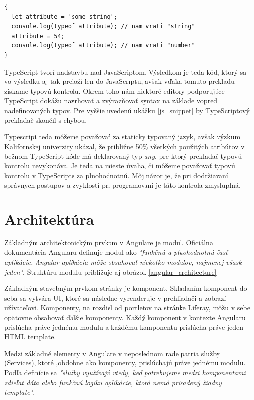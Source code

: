 \documentclass[
  digital, %
  twoside, %
  notable,   %
  nolof,   %
  nolot,   %
]{fithesis3}
\begin{document}
\begin{lstlisting}[caption={Kód v JavaScripte},captionpos=b,label=js_snippet]
{
  let attribute = 'some_string';
  console.log(typeof attribute); // nam vrati "string"
  attribute = 54;
  console.log(typeof attribute); // nam vrati "number"
}
\end{lstlisting}

TypeScript tvorí nadstavbu nad JavaScriptom. Výsledkom je teda kód, ktorý sa vo výsledku aj tak preloží len do JavaScriptu, avšak vďaka tomuto prekladu získame typovú kontrolu. Okrem toho nám niektoré editory podporujúce TypeScript dokážu navrhovať a zvýrazňovať syntax na základe vopred nadefinovaných typov. Pre vyššie uvedenú ukážku \ref{js_snippet} by TypeScriptový prekladač skončil s chybou.

Typescript teda môžeme považovať za staticky typovaný jazyk, avšak výzkum Kalifornskej univerzity\cite{ray2014large} ukázal, že približne 50\% všetkých použitých atribútov v bežnom TypeScript kóde má deklarovaný typ \textit{any}, pre ktorý prekladač typovú kontrolu nevykonáva. Je teda na mieste úvaha, či môžeme považovať typovú kontrolu v TypeScripte za plnohodnotnú. Môj názor je, že pri dodržiavaní správnych postupov a zvyklostí pri programovaní je táto kontrola zmysluplná.

\section{Architektúra}
Základným architektonickým prvkom v Angulare je modul. Oficiálna dokumentácia Angularu definuje modul ako \textit{"funkčnú a plnohodnotnú časť aplikácie. Angular aplikácia môže obsahovať niekoľko modulov, najmenej všask jeden"}\cite{angular}. Štruktúru modulu približuje aj obrázok \ref{angular_architecture}

Základným stavebným prvkom stránky je komponent. Skladaním komponent do seba sa vytvára UI, ktoré sa následne vyrenderuje v prehliadači a zobrazí užívateľovi. Komponenty, na rozdiel od portletov na stránke Liferay, môžu v sebe opätovne obsahovať ďalšie komponenty. Každý komponent v kontexte Angularu prislúcha práve jednému modulu a každému komponentu prislúcha práve jeden HTML template.

Medzi základné elementy v Angulare v neposlednom rade patria služby (Services), ktoré ,obdobne ako komponenty, prislúchajú práve jednému modulu. Podľa definície sa \textit{"služby využívajú vtedy, keď potrebujeme medzi komponentami zdieľat dáta alebo funkčnú logiku aplikácie, ktorá nemá priradený žiadny template"}\cite{angular}.
\end{document}
